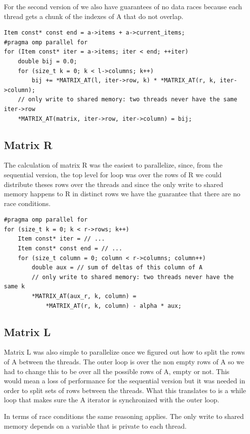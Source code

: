 \documentclass[a4paper]{article}
\begin{document}
For the second version of we also have guarantees of no data races because each
thread gets a chunk of the indexes of A that do not overlap.
\begin{verbatim}
Item const* const end = a->items + a->current_items;
#pragma omp parallel for
for (Item const* iter = a->items; iter < end; ++iter)
    double bij = 0.0;
    for (size_t k = 0; k < l->columns; k++)
        bij += *MATRIX_AT(l, iter->row, k) * *MATRIX_AT(r, k, iter->column);
    // only write to shared memory: two threads never have the same iter->row
    *MATRIX_AT(matrix, iter->row, iter->column) = bij;
\end{verbatim}

\subsection{Matrix R}

The calculation of matrix R was the easiest to parallelize, since, from the
sequential version, the top level for loop was over the rows of R we could
distribute theses rows over the threads and since the only write to shared
memory happens to R in distinct rows we have the guarantee that there are no
race conditions.

\begin{verbatim}
#pragma omp parallel for
for (size_t k = 0; k < r->rows; k++)
    Item const* iter = // ...
    Item const* const end = // ...
    for (size_t column = 0; column < r->columns; column++)
        double aux = // sum of deltas of this column of A
        // only write to shared memory: two threads never have the same k
        *MATRIX_AT(aux_r, k, column) =
            *MATRIX_AT(r, k, column) - alpha * aux;
\end{verbatim}

\subsection{Matrix L}

Matrix L was also simple to parallelize once we figured out how to split the
rows of A between the threads. The outer loop is over the non empty rows of A
so we had to change this to be over all the possible rows of A, empty or not.
This would mean a loss of performance for the sequential version but it was
needed in order to split sets of rows between the threads. What this translates
to is a while loop that makes sure the A iterator is synchronized with the outer
loop.

In terms of race conditions the same reasoning applies. The only write to shared
memory depends on a variable that is private to each thread.
\end{document}
